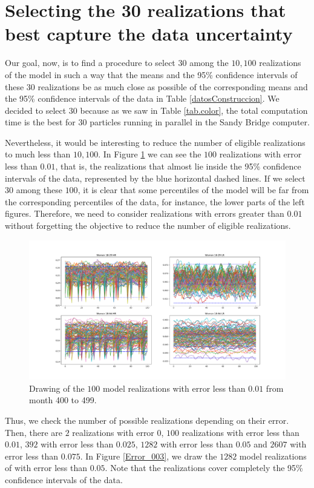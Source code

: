 \section{Selecting the 30 realizations that best capture the data uncertainty}
Our goal, now, is to find a procedure to select $30$ among the $10,100$ realizations of the model in such a way that the means and the 95\% confidence intervals of these $30$ realizations be as much close as possible of the corresponding means and the 95\% confidence intervals of the data in Table \ref{datosConstruccion}. We decided to select $30$ because as we saw in Table \ref{tab.color}, the total computation time is the best for $30$ particles running in parallel in the Sandy Bridge computer.

Nevertheless, it would be interesting to reduce the number of eligible realizations to much less than $10,100$. In Figure \ref{Error_0} we can see the $100$ realizations with error less than $0.01$, that is, the realizations that almost lie inside the 95\% confidence intervals of the data, represented by the blue horizontal dashed lines. If we select $30$ among these $100$, it is clear that some percentiles of the model will be far from the corresponding percentiles of the data, for instance, the lower parts of the left figures. Therefore, we need to consider realizations with errors greater than $0.01$ without forgetting the objective to reduce the number of eligible realizations.  

\begin{figure}[h!]
	\centering
	\includegraphics[width=\linewidth]{IMGs/1.-Calibrado/Error_001.pdf}
	\caption{Drawing of the $100$ model realizations with error less than $0.01$ from month 400 to 499. }
	\label{Error_0}
\end{figure}

Thus, we check the number of possible realizations depending on their error. Then, there are $2$ realizations with error $0$,  $100$ realizations with error less than $0.01$, $392$ with error less than $0.025$, $1282$ with error less than $0.05$ and $2607$ with error less than $0.075$. 
In Figure \ref{Error_003}, we draw the $1282$ model realizations of with error less than $0.05$. Note that the realizations cover completely the 95\% confidence intervals of the data. 

